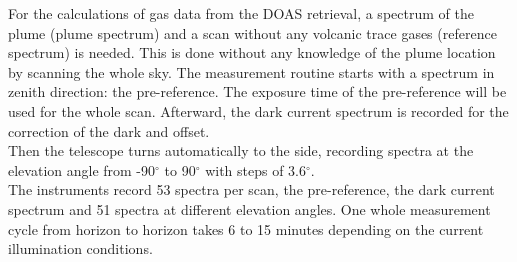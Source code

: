 For the calculations of gas data from the DOAS retrieval, a spectrum of the plume (plume spectrum) and a scan without any volcanic trace gases (reference spectrum) is needed.  This is done without any knowledge of the plume location by scanning the whole sky. 
The measurement routine starts with a spectrum in zenith direction: the pre-reference. The exposure time of the pre-reference will be used for the whole scan.
Afterward, the dark current spectrum is recorded for the correction of the dark and offset.\\
Then the telescope turns automatically to the side, recording spectra at the elevation angle from -90$^{\circ}$ to 90$^{\circ}$ with steps of 3.6$^{\circ}$. \\
The instruments record 53 spectra per scan, the pre-reference, the dark current spectrum and 51 spectra at different elevation angles.
One whole measurement cycle from horizon to horizon takes 6 to 15 minutes depending on the current illumination conditions.


